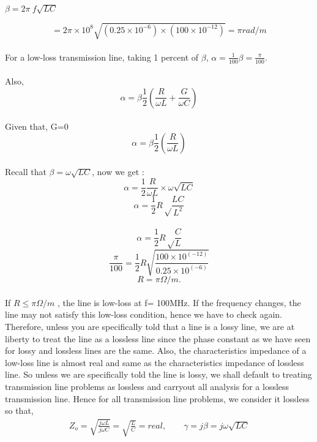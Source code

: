  $\beta = 2\pi \ f {\sqrt{LC}}$
	   
\begin{equation*}
=2 \pi \times 10^8 \sqrt{(0.25 \times 10^{-6}) \times (100 \times 10^{-12})}  = \pi rad/m
\end{equation*}\\
 For a low-loss transmission line, 
 taking 1 percent of $\beta$,
$ \alpha= \frac{1}{100} \beta = \frac{\pi}{100}$.\\\\
Also,
\begin{equation*}
\alpha = \beta\frac{1}{2} ( \frac{R}{\omega L} + \frac{G}{\omega C})
\end{equation*}\\
Given that, G=0\\
\begin{equation*}
\alpha = \beta\frac{1}{2} ( \frac{R}{\omega L} )
\end{equation*}\\
Recall that $\beta = \omega\sqrt{LC} $, now we get :
\begin{equation*}
\alpha = \frac{1}{2}\frac{R}{\omega L} \times \omega\sqrt{LC} 
\end{equation*}
\begin{equation*}
\alpha = \frac{1}{2} R \sqrt \frac{LC}{L^{2}} 
\end{equation*}\\
 \begin{equation*}
	 \alpha = \frac{1}{2} R \sqrt \frac{C}{L}
	 \end{equation*}
	 \begin{equation*}
	  \frac{\pi}{100} = \frac{1}{2} R \sqrt{\frac{100 \times 10^{(-12)}}{0.25 \times 10^{(-6)}}}
	 \end{equation*}
	 \begin{equation*}
	 R=\pi\Omega/m.
	 \end{equation*}\\
	 If $R \leq \pi\Omega/m$ , the line is low-loss at f= 100MHz. If the frequency changes, the line may not satisfy this low-loss condition, hence we have to check again.\\
	  Therefore, unless you are specifically told that a line is a lossy line, we are at liberty to treat the line as a lossless line since the phase constant as we have seen for lossy and lossless lines are the same. Also, the characteristics impedance of a low-loss line is almost real and same as the characteristics impedance of lossless line. So unless we are specifically told the line is lossy, we shall default to treating transmission line problems as lossless and carryout all analysis for a lossless transmission line. Hence for all transmission line problems, we consider it lossless so that, 
	  \begin{align*}
      Z_o = \sqrt{{\frac{j\omega L}{j\omega C}}} = \sqrt{\frac{L}{C}} = real , \quad \quad \gamma= j\beta = j\omega\sqrt{LC}
	  \end{align*}
	  
